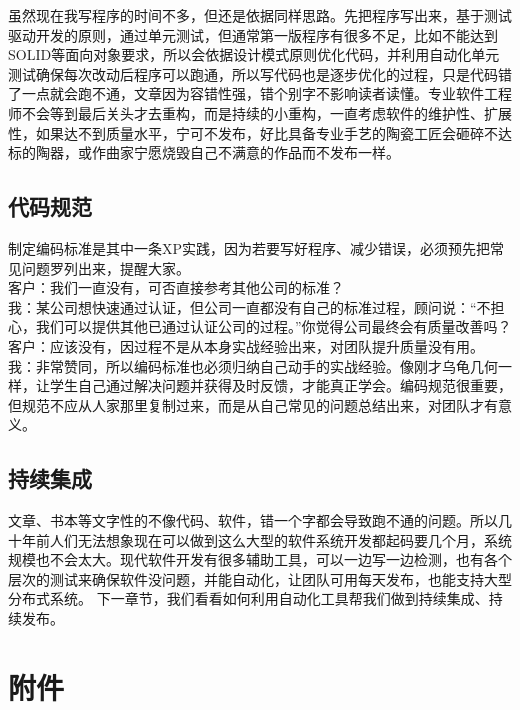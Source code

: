 虽然现在我写程序的时间不多，但还是依据同样思路。先把程序写出来，基于测试驱动开发的原则，通过单元测试，但通常第一版程序有很多不足，比如不能达到SOLID等面向对象要求，所以会依据设计模式原则优化代码，并利用自动化单元测试确保每次改动后程序可以跑通，所以写代码也是逐步优化的过程，只是代码错了一点就会跑不通，文章因为容错性强，错个别字不影响读者读懂。专业软件工程师不会等到最后关头才去重构，而是持续的小重构，一直考虑软件的维护性、扩展性，如果达不到质量水平，宁可不发布，好比具备专业手艺的陶瓷工匠会砸碎不达标的陶器，或作曲家宁愿烧毁自己不满意的作品而不发布一样。

\hypertarget{ux4ee3ux7801ux89c4ux8303}{%
\subsection{代码规范}\label{ux4ee3ux7801ux89c4ux8303}}

制定编码标准是其中一条XP实践，因为若要写好程序、减少错误，必须预先把常见问题罗列出来，提醒大家。\\
客户：我们一直没有，可否直接参考其他公司的标准？\\
我：某公司想快速通过认证，但公司一直都没有自己的标准过程，顾问说：“不担心，我们可以提供其他已通过认证公司的过程。”你觉得公司最终会有质量改善吗？\\
客户：应该没有，因过程不是从本身实战经验出来，对团队提升质量没有用。\\
我：非常赞同，所以编码标准也必须归纳自己动手的实战经验。像刚才乌龟几何一样，让学生自己通过解决问题并获得及时反馈，才能真正学会。编码规范很重要，但规范不应从人家那里复制过来，而是从自己常见的问题总结出来，对团队才有意义。

\hypertarget{ux6301ux7eedux96c6ux6210}{%
\subsection{持续集成}\label{ux6301ux7eedux96c6ux6210}}

文章、书本等文字性的不像代码、软件，错一个字都会导致跑不通的问题。所以几十年前人们无法想象现在可以做到这么大型的软件系统开发都起码要几个月，系统规模也不会太大。现代软件开发有很多辅助工具，可以一边写一边检测，也有各个层次的测试来确保软件没问题，并能自动化，让团队可用每天发布，也能支持大型分布式系统。
下一章节，我们看看如何利用自动化工具帮我们做到持续集成、持续发布。

\hypertarget{ux9644ux4ef6}{%
\section{附件}\label{ux9644ux4ef6}}

